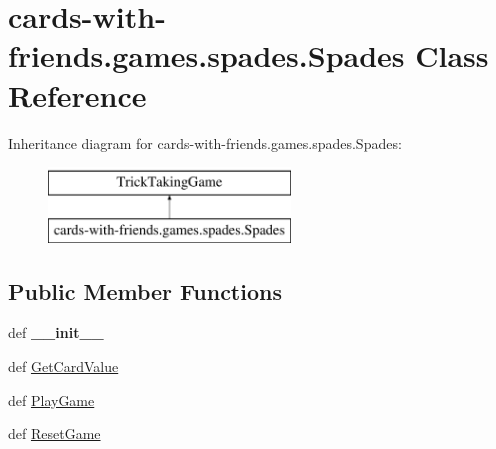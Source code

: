 \hypertarget{classcards-with-friends_1_1games_1_1spades_1_1_spades}{\section{cards-\/with-\/friends.games.\-spades.\-Spades Class Reference}
\label{classcards-with-friends_1_1games_1_1spades_1_1_spades}
}
Inheritance diagram for cards-\/with-\/friends.games.\-spades.\-Spades\-:\begin{figure}[H]
\begin{center}
\leavevmode
\includegraphics[height=2.000000cm]{classcards-with-friends_1_1games_1_1spades_1_1_spades}
\end{center}
\end{figure}
\subsection*{Public Member Functions}
\begin{DoxyCompactItemize}
\item 
\hypertarget{classcards-with-friends_1_1games_1_1spades_1_1_spades_a7588de7e14ab2dc26b08d371e800d94e}{def {\bfseries \-\_\-\-\_\-init\-\_\-\-\_\-}}\label{classcards-with-friends_1_1games_1_1spades_1_1_spades_a7588de7e14ab2dc26b08d371e800d94e}

\item 
def \hyperlink{classcards-with-friends_1_1games_1_1spades_1_1_spades_a4d88006569324913fb3410ab25195e5c}{Get\-Card\-Value}
\item 
def \hyperlink{classcards-with-friends_1_1games_1_1spades_1_1_spades_a06a9acc462f41d4eb61279c0ab6b09d7}{Play\-Game}
\item 
def \hyperlink{classcards-with-friends_1_1games_1_1spades_1_1_spades_a841395ddce5b12bee3d047dac25334ff}{Reset\-Game}
\end{DoxyCompactItemize}
